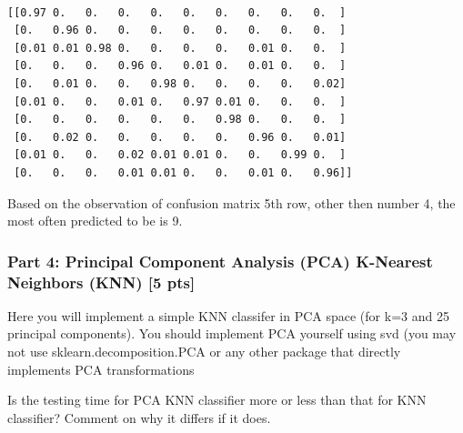 \documentclass[11pt]{article}
\begin{document}
    \begin{center}
    \end{center}
    { \hspace*{\fill} \\}
    
    \begin{Verbatim}[commandchars=\\\{\}]
[[0.97 0.   0.   0.   0.   0.   0.   0.   0.   0.  ]
 [0.   0.96 0.   0.   0.   0.   0.   0.   0.   0.  ]
 [0.01 0.01 0.98 0.   0.   0.   0.   0.01 0.   0.  ]
 [0.   0.   0.   0.96 0.   0.01 0.   0.01 0.   0.  ]
 [0.   0.01 0.   0.   0.98 0.   0.   0.   0.   0.02]
 [0.01 0.   0.   0.01 0.   0.97 0.01 0.   0.   0.  ]
 [0.   0.   0.   0.   0.   0.   0.98 0.   0.   0.  ]
 [0.   0.02 0.   0.   0.   0.   0.   0.96 0.   0.01]
 [0.01 0.   0.   0.02 0.01 0.01 0.   0.   0.99 0.  ]
 [0.   0.   0.   0.01 0.01 0.   0.   0.01 0.   0.96]]

    \end{Verbatim}

    Based on the observation of confusion matrix 5th row, other then number
4, the most often predicted to be is 9.

    \hypertarget{part-4-principal-component-analysis-pca-k-nearest-neighbors-knn-5-pts}{%
\subsubsection{Part 4: Principal Component Analysis (PCA) K-Nearest
Neighbors (KNN) {[}5
pts{]}}\label{part-4-principal-component-analysis-pca-k-nearest-neighbors-knn-5-pts}}

Here you will implement a simple KNN classifer in PCA space (for k=3 and
25 principal components). You should implement PCA yourself using svd
(you may not use sklearn.decomposition.PCA or any other package that
directly implements PCA transformations

Is the testing time for PCA KNN classifier more or less than that for
KNN classifier? Comment on why it differs if it does.
\end{document}
